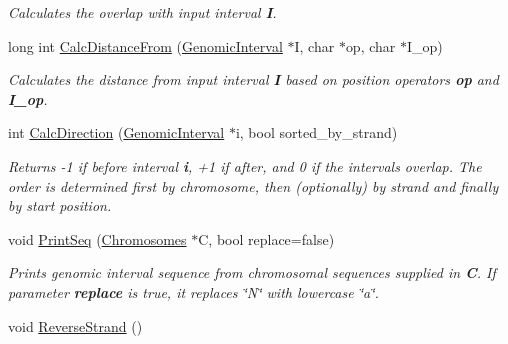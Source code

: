 \begin{DoxyCompactItemize}
\begin{DoxyCompactList}\small\item\em Calculates the overlap with input interval {\bfseries I}. \end{DoxyCompactList}\item 
\hypertarget{classGenomicInterval_aa801336aa07a0029d97d7914a747abd3}{
long int \hyperlink{classGenomicInterval_aa801336aa07a0029d97d7914a747abd3}{CalcDistanceFrom} (\hyperlink{classGenomicInterval}{GenomicInterval} $\ast$I, char $\ast$op, char $\ast$I\_\-op)}
\label{classGenomicInterval_aa801336aa07a0029d97d7914a747abd3}

\begin{DoxyCompactList}\small\item\em Calculates the distance from input interval {\bfseries I} based on position operators {\bfseries op} and {\bfseries I\_\-op}. \end{DoxyCompactList}\item 
\hypertarget{classGenomicInterval_a7856012eda653222a1ac5482510bacc7}{
int \hyperlink{classGenomicInterval_a7856012eda653222a1ac5482510bacc7}{CalcDirection} (\hyperlink{classGenomicInterval}{GenomicInterval} $\ast$i, bool sorted\_\-by\_\-strand)}
\label{classGenomicInterval_a7856012eda653222a1ac5482510bacc7}

\begin{DoxyCompactList}\small\item\em Returns -\/1 if before interval {\bfseries i}, +1 if after, and 0 if the intervals overlap. The order is determined first by chromosome, then (optionally) by strand and finally by start position. \end{DoxyCompactList}\item 
\hypertarget{classGenomicInterval_ab14f526a4df4f148e1b843ee0dc10d04}{
void \hyperlink{classGenomicInterval_ab14f526a4df4f148e1b843ee0dc10d04}{PrintSeq} (\hyperlink{classChromosomes}{Chromosomes} $\ast$C, bool replace=false)}
\label{classGenomicInterval_ab14f526a4df4f148e1b843ee0dc10d04}

\begin{DoxyCompactList}\small\item\em Prints genomic interval sequence from chromosomal sequences supplied in {\bfseries C}. If parameter {\bfseries replace} is true, it replaces \char`\"{}N\char`\"{} with lowercase \char`\"{}a\char`\"{}. \end{DoxyCompactList}\item 
\hypertarget{classGenomicInterval_aa410816fa04d76edd7caeb9ae2442ae1}{
void \hyperlink{classGenomicInterval_aa410816fa04d76edd7caeb9ae2442ae1}{ReverseStrand} ()}
\label{classGenomicInterval_aa410816fa04d76edd7caeb9ae2442ae1}


\end{DoxyCompactItemize}
